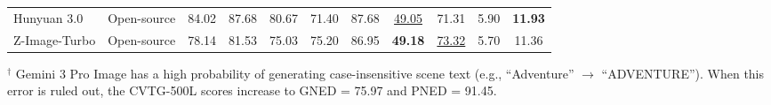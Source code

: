 \begin{table}[t]
{\begin{tabular}{ll|ccc|cc|cc|cc}
        Hunyuan 3.0        & Open-source & 84.02 & 87.68 & 80.67 & 71.40 & 87.68 & \underline{49.05} & 71.31 & 5.90 & \textbf{11.93} \\
        Z-Image-Turbo      & Open-source & 78.14 & 81.53 & 75.03 & 75.20 & 86.95 & \textbf{49.18} & \underline{73.32} & 5.70 & 11.36 \\
        \bottomrule
    \end{tabular}
    }
    \vspace{0.5ex}
    \par\noindent\scriptsize $^\dagger$ Gemini 3 Pro Image has a high probability of generating case-insensitive scene text (e.g., ``Adventure'' $\rightarrow$ ``ADVENTURE''). When this error is ruled out, the CVTG-500L scores increase to GNED = 75.97 and PNED = 91.45.
\end{table}
